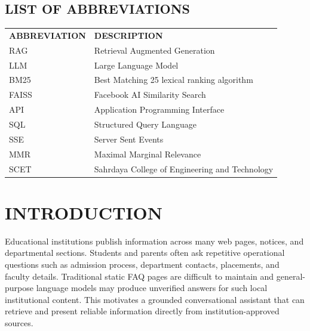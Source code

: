 \documentclass[12pt,a4paper]{report}
\begin{document}
\newpage
\pagestyle{plain}
\begin{center}
\section*{\large{ LIST OF ABBREVIATIONS}}
\end{center}
\vspace{1cm}
\begin{center}
\begin{table}[h!]
\begin{tabular}{p{6cm}p{8cm}}
\textbf{ABBREVIATION} & \textbf{DESCRIPTION} \\
RAG & Retrieval Augmented Generation \\
LLM & Large Language Model \\
BM25 & Best Matching 25 lexical ranking algorithm \\
FAISS & Facebook AI Similarity Search \\
API & Application Programming Interface \\
SQL & Structured Query Language \\
SSE & Server Sent Events \\
MMR & Maximal Marginal Relevance \\
SCET & Sahrdaya College of Engineering and Technology \\
\end{tabular}
\end{table}
\end{center}

\newpage
{}
\renewcommand{\chaptername}{CHAPTER}
\renewcommand*{\thepage}{\footnotesize\arabic{page}}

\chapter{INTRODUCTION}
\thispagestyle{fancy}
\onehalfspacing

\setlength{\parindent}{5ex}
\hspace*{1cm}Educational institutions publish information across many web pages, notices, and departmental sections. Students and parents often ask repetitive operational questions such as admission process, department contacts, placements, and faculty details. Traditional static FAQ pages are difficult to maintain and general-purpose language models may produce unverified answers for such local institutional content. This motivates a grounded conversational assistant that can retrieve and present reliable information directly from institution-approved sources.
\end{document}
